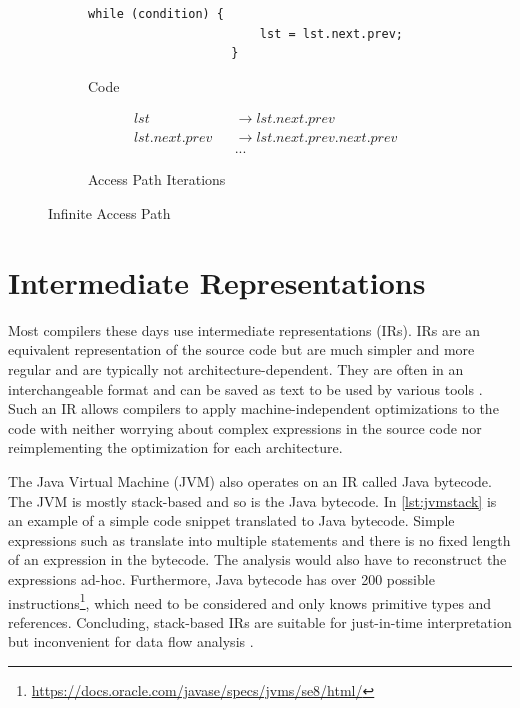 \documentclass[../draft.tex]{subfiles}
\begin{document}
    \begin{figure}[t]
        \centering
        \begin{subfigure}[b]{0.45\textwidth}
            \centering
            \begin{adjustbox}{max width=\columnwidth}
                \begin{lstlisting}[gobble=20]
                    while (condition) {
                        lst = lst.next.prev;
                    }
                \end{lstlisting}
            \end{adjustbox}
            \caption{Code}
        \end{subfigure}
        \qquad
        \begin{subfigure}[b]{0.45\textwidth}
            \centering
            \small
            $$
            \begin{aligned}
                &lst& &\rightarrow lst.next.prev\\
                &lst.next.prev& &\rightarrow lst.next.prev.next.prev\\
                & & &...
            \end{aligned}
            $$
            \normalsize
            \caption{Access Path Iterations}
        \end{subfigure}
        \caption{Infinite Access Path}
        \label{lst:infiniteap}
    \end{figure}

    \section{Intermediate Representations}\label{s:jimple}
    Most compilers these days use intermediate representations (IRs). IRs are an equivalent representation of the source code but are much simpler and more regular and are typically not architecture-dependent. They are often in an interchangeable format and can be saved as text to be used by various tools \cite{Thain2019}.
    Such an IR allows compilers to apply machine-independent optimizations to the code with neither worrying about complex expressions in the source code nor reimplementing the optimization for each architecture. 

    The Java Virtual Machine (JVM) also operates on an IR called Java bytecode. The JVM is mostly stack-based and so is the Java bytecode. In \autoref{lst:jvmstack} is an example of a simple code snippet translated to Java bytecode. Simple expressions such as  translate into multiple statements and there is no fixed length of an expression in the bytecode. The analysis would also have to reconstruct the expressions ad-hoc. Furthermore, Java bytecode has over 200 possible instructions\footnote{\url{https://docs.oracle.com/javase/specs/jvms/se8/html/}}, which need to be considered and only knows primitive types and references. Concluding, stack-based IRs are suitable for just-in-time interpretation but inconvenient for data flow analysis \cite{Valleerai2004}.
\end{document}
